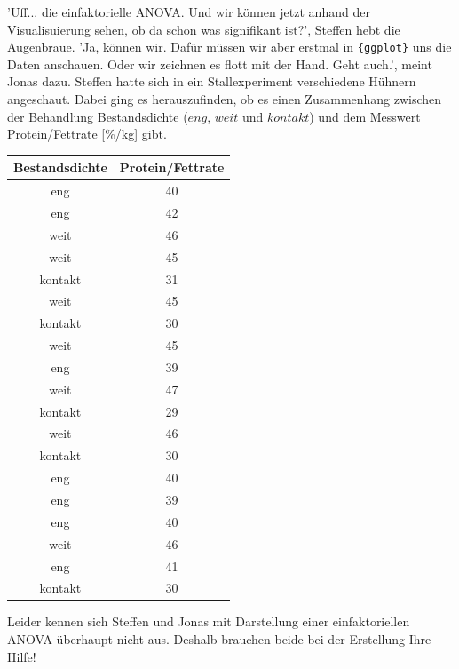 \documentclass[a4paper, 9pt]{scrartcl}\usepackage[]{graphicx}\usepackage[]{xcolor}
\newenvironment{knitrout}{}{} %
\begin{document}
'Uff... die einfaktorielle ANOVA. Und wir können jetzt anhand der Visualisuierung sehen, ob da schon was signifikant ist?', Steffen hebt die Augenbraue. 'Ja, können wir. Dafür müssen wir aber erstmal in \texttt{\{ggplot\}} uns die Daten anschauen. Oder wir zeichnen es flott mit der Hand. Geht auch.', meint Jonas dazu. Steffen hatte sich in ein Stallexperiment verschiedene Hühnern angeschaut. Dabei ging es herauszufinden, ob es einen Zusammenhang zwischen der Behandlung Bestandsdichte ($eng$, $weit$ und $kontakt$) und dem Messwert Protein/Fettrate [\%/kg] gibt.

\begin{knitrout}
\color{fgcolor}\begin{table}[!h]
\centering
\begin{tabular}{cc}
\toprule
Bestandsdichte & Protein/Fettrate\\
\midrule
eng & 40\\
eng & 42\\
weit & 46\\
weit & 45\\
kontakt & 31\\
\addlinespace
weit & 45\\
kontakt & 30\\
weit & 45\\
eng & 39\\
weit & 47\\
\addlinespace
kontakt & 29\\
weit & 46\\
kontakt & 30\\
eng & 40\\
eng & 39\\
\addlinespace
eng & 40\\
weit & 46\\
eng & 41\\
kontakt & 30\\
\bottomrule
\end{tabular}
\end{table}

\end{knitrout}

Leider kennen sich Steffen und Jonas mit Darstellung einer einfaktoriellen ANOVA überhaupt nicht aus. Deshalb brauchen beide bei der Erstellung Ihre Hilfe! 
\end{document}
